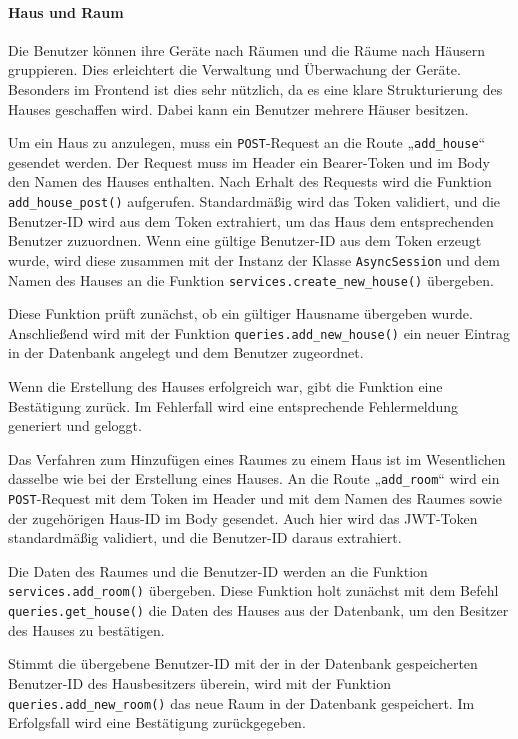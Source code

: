 \documentclass[12pt, letterpaper]{article}
\begin{document}
  \paragraph{Haus und Raum}
  \par \textbf{}
  \par Die Benutzer können ihre Geräte nach Räumen und die Räume nach Häusern gruppieren. Dies erleichtert die Verwaltung und Überwachung der Geräte. Besonders im Frontend ist dies sehr nützlich, da es eine klare Strukturierung des Hauses geschaffen wird. Dabei kann ein Benutzer mehrere Häuser besitzen.
  \par Um ein Haus zu anzulegen, muss ein \texttt{POST}-Request an die Route „\texttt{add\_house}“ gesendet werden. Der Request muss im Header ein Bearer-Token und im Body den Namen des Hauses enthalten. Nach Erhalt des Requests wird die Funktion \texttt{add\_house\_post()} aufgerufen. Standardmäßig wird das Token validiert, und die Benutzer-ID wird aus dem Token extrahiert, um das Haus dem entsprechenden Benutzer zuzuordnen. Wenn eine gültige Benutzer-ID aus dem Token erzeugt wurde, wird diese zusammen mit der Instanz der Klasse \texttt{AsyncSession} und dem Namen des Hauses an die Funktion \texttt{services.create\_new\_house()} übergeben.
  \par Diese Funktion prüft zunächst, ob ein gültiger Hausname übergeben wurde. Anschließend wird mit der Funktion \texttt{queries.add\_new\_house()} ein neuer Eintrag in der Datenbank angelegt und dem Benutzer zugeordnet. 
  \par Wenn die Erstellung des Hauses erfolgreich war, gibt die Funktion eine Bestätigung zurück. Im Fehlerfall wird eine entsprechende Fehlermeldung generiert und geloggt.
  \par Das Verfahren zum Hinzufügen eines Raumes zu einem Haus ist im Wesentlichen dasselbe wie bei der Erstellung eines Hauses. An die Route „\texttt{add\_room}“ wird ein \texttt{POST}-Request mit dem Token im Header und mit dem Namen des Raumes sowie der zugehörigen Haus-ID im Body gesendet. Auch hier wird das JWT-Token standardmäßig validiert, und die Benutzer-ID daraus extrahiert. 
  \par Die Daten des Raumes und die Benutzer-ID werden an die Funktion \texttt{services.add\_room()} übergeben. Diese Funktion holt zunächst mit dem Befehl \texttt{queries.get\_house()} die Daten des Hauses aus der Datenbank, um den Besitzer des Hauses zu bestätigen. 
  \par Stimmt die übergebene Benutzer-ID mit der in der Datenbank gespeicherten Benutzer-ID des Hausbesitzers überein, wird mit der Funktion \texttt{queries.add\_new\_room()} das neue Raum in der Datenbank gespeichert. Im Erfolgsfall wird eine Bestätigung zurückgegeben. 
\end{document}
